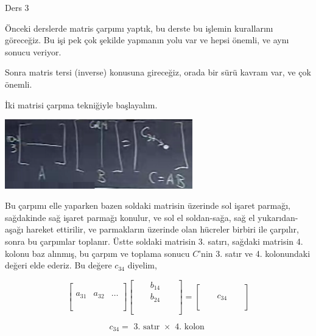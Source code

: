 \documentclass[12pt,fleqn]{article}\usepackage{../../common}
\begin{document}
Ders 3

Önceki derslerde matris çarpımı yaptık, bu derste bu işlemin kurallarını
göreceğiz. Bu işi pek çok şekilde yapmanın yolu var ve hepsi önemli, ve
aynı sonucu veriyor.

Sonra matris tersi (inverse) konusuna gireceğiz, orada bir sürü kavram var,
ve çok önemli. 

İki matrisi çarpma tekniğiyle başlayalım. 

\includegraphics[height=3cm]{3_01.png}

Bu çarpımı elle yaparken bazen soldaki matrisin üzerinde sol işaret
parmağı, sağdakinde sağ işaret parmağı konulur, ve sol el soldan-sağa, sağ
el yukarıdan-aşağı hareket ettirilir, ve parmakların üzerinde olan hücreler
birbiri ile çarpılır, sonra bu çarpımlar toplanır. Üstte soldaki matrisin
3. satırı, sağdaki matrisin 4. kolonu baz alınmış, bu çarpım ve toplama
sonucu $C$'nin 3. satır ve 4. kolonundaki değeri elde ederiz. Bu değere
$c_{34}$ diyelim,

$$ 
\left[\begin{array}{rrrr}
\\
\\
a_{31} & a_{32} & \dots \\
\\
\\
\end{array}\right]
\left[\begin{array}{rrrrr}
& & b_{14} & & \\
& & b_{24} & & \\
& &  & & \\
& &  & & \\
& &  & & 
\end{array}\right] 
=
\left[\begin{array}{rrrrr}
& &  & & \\
& &  & & \\
& & c_{34} & & \\
& &  & & \\
& &  & & 
\end{array}\right]
$$ 

$$ c_{34} = \textrm{ 3. satır } \times \textrm{ 4. kolon } $$
\end{document}
